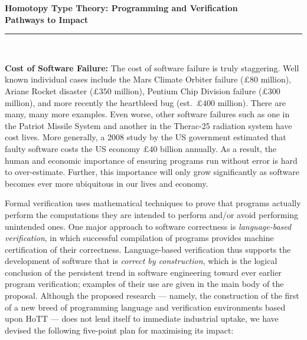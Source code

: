 \documentclass[a4paper,11pt]{article}
\begin{document}
\thispagestyle{plain}

\begin{center}

  {\Large {\bf Homotopy Type Theory: Programming and Verification \\
\vspace{0.2in} 
Pathways to Impact}}\\[1ex]   



\vspace*{-0.1in}



  \rule{150mm}{.5mm}\\[2ex]

\end{center}



\noindent



\vspace*{-0.1in}

{\bf Cost of Software Failure:} The cost of software failure is truly
staggering. Well known individual cases include the Mars Climate
Orbiter failure ($\pounds 80$ million), Ariane Rocket disaster
($\pounds 350$ million), Pentium Chip Division failure ($\pounds 300$
million), and more recently the heartbleed bug (est.\ $\pounds 400$ million).
There are many, many more examples. Even worse, other
software failures such as one in the Patriot Missile System and
another in the Therac-25 radiation system have cost lives. More
generally, a 2008 study by the US government estimated that faulty
software costs the US economy $\pounds 40$ billion annually.  As a
result, the human and economic importance of ensuring programs run
without error is hard to over-estimate. Further, this importance will
only grow significantly as software becomes ever more ubiquitous in
our lives and economy.

Formal verification uses mathematical techniques to prove that
programs actually perform the computations they are intended to
perform and/or avoid performing unintended ones. One major approach to
software correctness is {\em language-based verification}, in which
successful compilation of programs provides machine certification of
their correctness. Language-based verification thus supports the
development of software that is {\em correct by construction}, which
is the logical conclusion of the persistent trend in software
engineering toward ever earlier program verification; examples of
their use are given in the main body of the proposal. Although the
proposed research --- namely, the construction of the first of a new
breed of programming language and verification environments based upon
HoTT --- does not lend itself to immediate industrial uptake, we have
devised the following five-point plan for maximising its impact:
\end{document}
